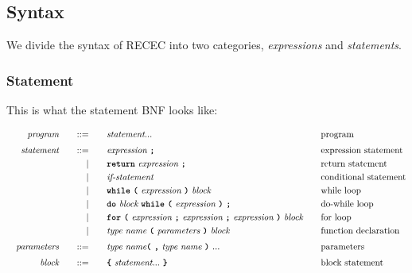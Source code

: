 \documentclass[a4paper]{article}
\begin{document}
\subsection{Syntax}

We divide the syntax of RECEC into two categories, \textit{expressions} and \textit{statements}.

\subsubsection{Statement}
\label{statement}
This is what the statement BNF looks like:

\addtolength{\jot}{-0.5mm}
\begin{alignat*}{9}
    && \textit{program}    &&\quad ::= &\quad && \textit{statement} ... && \textrm{program} \\[1mm]
    && \textit{statement}  &&\quad ::= &\quad && \textit{expression} \ \textbf{\texttt{;}} && \textrm{expression statement} \\
	&&                       && |   &\quad && \textbf{\texttt{return}}\  \textit{expression} \ \textbf{\texttt{;}} && \textrm{return statement}\\
	&&                       && |   &\quad && \textit{if-statement} \quad && \textrm{conditional statement}\\
	&&                       && |   &\quad && \textbf{\texttt{while}}\  \textbf{\texttt{(}}\  \textit{expression} \ \textbf{\texttt{)}} \ \textit{block} && \textrm{while loop}\\
	&&						 && |	&\quad && \textbf{\texttt{do}} \ \textit{block} \ \textbf{\texttt{while}}\  \textbf{\texttt{(}}\  \textit{expression} \ \textbf{\texttt{)}} \ \textbf{\texttt{;}} && \textrm{do-while loop}\\
	&&						 && | 	 &\quad && \textbf{\texttt{for}}\  \textbf{\texttt{(}}\  \textit{expression} \ \textbf{\texttt{;}} \ \textit{expression} \ \textbf{\texttt{;}} \ \textit{expression} \ \textbf{\texttt{)}} \ \textit{block} \ \ \  && \textrm{for loop}\\
	&&						&& 	| &\quad && \textit{type}\  \textit{name} \ \textbf{\texttt{(}}\  \textit{parameters} \ \textbf{\texttt{)}}\ \textit{block} \quad && \textrm{function declaration}\\[1mm]
	&& \textit{parameters}    &&\quad ::= &\quad && \textit{type}\  \textit{name} \textbf{\texttt{(}}\  \textbf{\texttt{,}}\ \textit{type}\  \textit{name} \ \textbf{\texttt{)}}\ ... && \textrm{parameters} \\[1mm]
	&& \textit{block}         &&\quad ::= &\quad && \textbf{\texttt{\{}}\  \textit{statement} ... \ \textbf{\texttt{\}}} \quad && \textrm{block statement} \\[1mm]

\end{alignat*}
\end{document}
